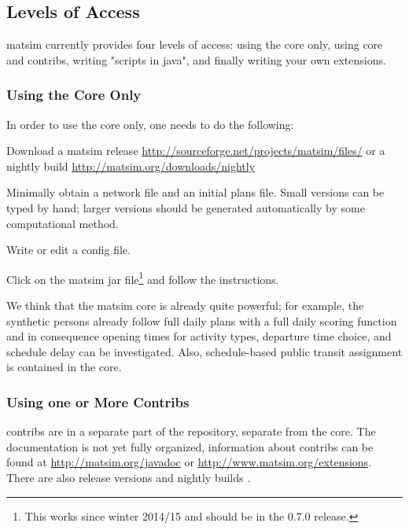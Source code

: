 \subsection{Levels of Access}
\label{sec:levels-of-access}
\gls{matsim} currently provides four levels of access: using the core only, using core and \glspl{contrib}, writing "scripts in \gls{java}", and finally writing your own \glspl{extension}.

\subsubsection{Using the Core Only}
\label{sec:using-core-only}
In order to use the core only, one needs to do the following:
\begin{compactitem}
\item Download a \gls{matsim} release \url{http://sourceforge.net/projects/matsim/files/} or a nightly build \url{http://matsim.org/downloads/nightly} %
\item Minimally obtain a network file and an initial plans file.  Small versions can be typed by hand; larger versions should be generated automatically by some computational method.
\item Write or edit a config file.
\item Click on the \gls{matsim} jar file\footnote{This works since winter 2014/15 and should be in the 0.7.0 release.} and follow the instructions. 
\end{compactitem}
We think that the \gls{matsim} core is already quite powerful; for example, the synthetic persons already follow full daily plans with a full daily scoring function and in consequence opening times for activity types, departure time choice, and schedule delay can be investigated.  Also, schedule-based public transit assignment is contained in the core.

\subsubsection{Using one or More Contribs}
\label{sec:using-contribs}
\Glspl{contrib} are in a separate part of the repository, separate from the core.  The documentation is not yet fully organized, information about \glspl{contrib} can be found at \url{http://matsim.org/javadoc} or \url{http://www.matsim.org/extensions}.  There are also release versions   and nightly builds .

